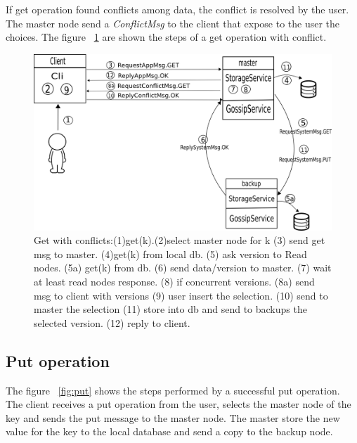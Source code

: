 If get operation found conflicts among data, the conflict is resolved by the user. The master node send a \textit{ConflictMsg} to the client that expose to the user the choices.
The figure ~\ref{fig:getConflict} are shown the steps of a get operation with conflict.

\begin{figure}[H]
\centering
\includegraphics[scale=0.5]{figures/getConflict.png}
\caption{Get with conflicts:(1)get(k).(2)select master node for k (3) send get msg to master. (4)get(k) from local db. (5) ask version to Read nodes. (5a) get(k) from db. (6) send data/version to master. (7) wait at least read nodes response. (8) if concurrent versions. (8a) send msg to client with versions (9) user insert the selection. (10) send to master the selection (11) store into db and send to backups the selected version. (12) reply to client.}
\label{fig:getConflict}
\end{figure}

\subsection*{Put operation}

The figure ~\ref{fig:put} shows the steps performed by a successful put operation.
The client receives a put operation from the user, selects the master node of the key and sends the put message to the master node. The master store the new value for the key to the local database and send a copy to the backup node.

